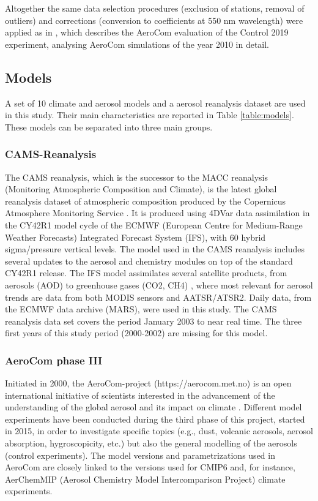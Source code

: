 \documentclass[acp, manuscript]{copernicus}
\begin{document}
Altogether the same data selection procedures (exclusion of stations, removal of outliers) and corrections (conversion to coefficients at 550 nm wavelength) were applied as in \cite{jonaseval}, which describes the AeroCom evaluation of the Control 2019 experiment, analysing AeroCom simulations of the year 2010 in detail.

\subsection{Models}
A set of 10 climate and aerosol models and a aerosol reanalysis dataset are used in this study. Their main characteristics are reported in Table \ref{table:models}. These models can be separated into three main groups.

\subsubsection{CAMS-Reanalysis}
The CAMS reanalysis, which is the successor to the MACC reanalysis (Monitoring Atmospheric Composition and Climate), is the latest global reanalysis dataset of atmospheric composition produced by the Copernicus Atmosphere Monitoring Service \citep{inness2019cams}. It is produced using 4DVar data assimilation in the CY42R1 model cycle of the ECMWF (European Centre for Medium-Range Weather Forecasts) Integrated Forecast System (IFS), with 60 hybrid sigma/pressure vertical levels. The model used in the CAMS reanalysis includes several updates to the aerosol and chemistry modules on top of the standard CY42R1 release. The IFS model assimilates several satellite products, from aerosols (AOD) to greenhouse gases (CO2, CH4) \citep{inness2019cams}, where most relevant for aerosol trends are data from both MODIS sensors and AATSR/ATSR2. Daily data, from the ECMWF data archive (MARS), were used in this study. The CAMS reanalysis data set covers the period January 2003 to near real time. The three first years of this study period (2000-2002) are missing for this model.

\subsubsection{AeroCom phase III}
Initiated in 2000, the AeroCom-project (https://aerocom.met.no) is an open international initiative of scientists interested in the advancement of the understanding of the global aerosol and its impact on climate \citep{schulz2006radiative}. Different model experiments have been conducted during the third phase of this project, started in 2015, in order to investigate specific topics (e.g., dust, volcanic aerosols, aerosol absorption, hygroscopicity, etc.) but also the general modelling of the aerosols (control experiments). The model versions and parametrizations used in AeroCom are closely linked to the versions used for CMIP6 and, for instance, AerChemMIP (Aerosol Chemistry Model Intercomparison Project) climate experiments.
\end{document}
